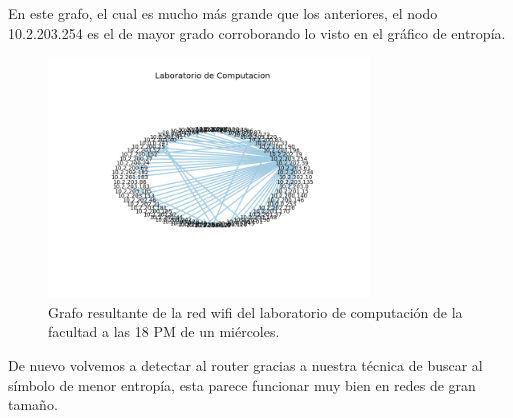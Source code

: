 En este grafo, el cual es mucho más grande que los anteriores, el nodo 10.2.203.254 es el de mayor grado corroborando lo visto en el gráfico de entropía.

\begin{figure}[H]
\centering
	\includegraphics[width=8.5cm]{figs/grafo_dc.png}
	\caption{Grafo resultante de la red wifi del laboratorio de computación de la facultad a las 18 PM de un miércoles.}
	\label{fig:dc-grafo}
\end{figure}

De nuevo volvemos a detectar al router gracias a nuestra técnica de buscar al símbolo de menor entropía, esta parece funcionar muy bien en redes de gran tamaño.
